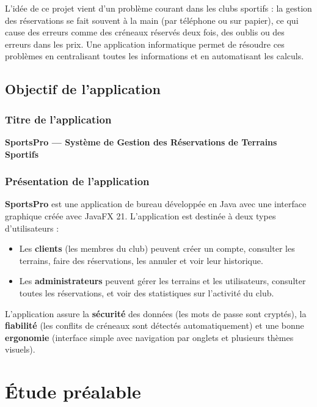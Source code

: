 \documentclass[12pt, a4paper]{report}
\begin{document}
L'idée de ce projet vient d'un problème courant dans les clubs sportifs : la
gestion des réservations se fait souvent à la main (par téléphone ou sur papier),
ce qui cause des erreurs comme des créneaux réservés deux fois, des oublis ou
des erreurs dans les prix. Une application informatique permet de résoudre ces
problèmes en centralisant toutes les informations et en automatisant les calculs.

\section{Objectif de l'application}

\subsection*{Titre de l'application}

\begin{center}
{\large\bfseries\color{primary}
SportsPro — Système de Gestion des Réservations de Terrains Sportifs}
\end{center}

\subsection*{Présentation de l'application}

\textbf{SportsPro} est une application de bureau développée en Java avec une
interface graphique créée avec JavaFX 21. L'application est destinée à deux types
d'utilisateurs :

\begin{itemize}
  \item Les \textbf{clients} (les membres du club) peuvent créer un compte,
        consulter les terrains, faire des réservations, les annuler et voir
        leur historique.
  \item Les \textbf{administrateurs} peuvent gérer les terrains et les utilisateurs,
        consulter toutes les réservations, et voir des statistiques sur
        l'activité du club.
\end{itemize}

L'application assure la \textbf{sécurité} des données (les mots de passe sont
cryptés), la \textbf{fiabilité} (les conflits de créneaux sont détectés
automatiquement) et une bonne \textbf{ergonomie} (interface simple avec navigation
par onglets et plusieurs thèmes visuels).

\chapter{Étude préalable}
\end{document}
